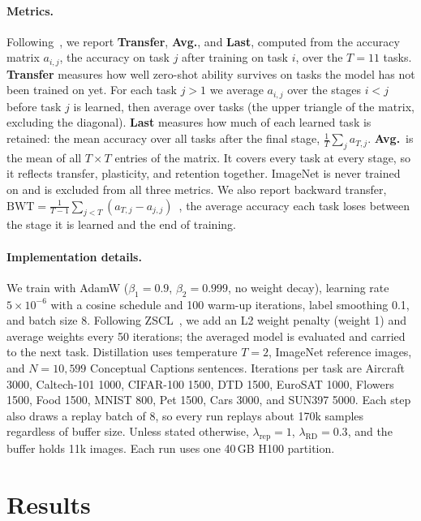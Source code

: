 \documentclass[10pt,twocolumn,letterpaper]{article}
\begin{document}
\paragraph{Metrics.}
Following~\cite{zheng2023zscl}, we report \textbf{Transfer}, \textbf{Avg.}, and
\textbf{Last}, computed from the accuracy matrix $a_{i,j}$, the accuracy on
task $j$ after training on task $i$, over the $T{=}11$ tasks.
\textbf{Transfer} measures how well zero-shot ability survives on tasks the
model has not been trained on yet. For each task $j>1$ we average
$a_{i,j}$ over the stages $i<j$ before task $j$ is learned, then average over
tasks (the upper triangle of the matrix, excluding the diagonal).
\textbf{Last} measures how much of each learned task is retained: the mean
accuracy over all tasks after the final stage, $\frac{1}{T}\sum_j a_{T,j}$.
\textbf{Avg.}\ is the mean of all $T\times T$ entries of the matrix. It covers
every task at every stage, so it reflects transfer, plasticity, and retention
together. ImageNet is never trained on and is excluded from all three
metrics. We also report backward transfer,
$\text{BWT}=\frac{1}{T-1}\sum_{j<T}(a_{T,j}-a_{j,j})$~\cite{lopezpaz2017gem},
the average accuracy each task loses between the stage it is learned and the
end of training.

\paragraph{Implementation details.}
We train with AdamW ($\beta_1{=}0.9$, $\beta_2{=}0.999$, no weight decay),
learning rate $5{\times}10^{-6}$ with a cosine schedule and 100 warm-up
iterations, label smoothing 0.1, and batch size 8. Following
ZSCL~\cite{zheng2023zscl}, we add an L2 weight penalty (weight 1) and average
weights every 50 iterations; the averaged model is evaluated and carried to the
next task. Distillation uses temperature $T{=}2$, ImageNet reference images, and
$N{=}10{,}599$ Conceptual Captions sentences. Iterations per task are Aircraft
3000, Caltech-101 1000, CIFAR-100 1500, DTD 1500, EuroSAT 1000, Flowers 1500,
Food 1500, MNIST 800, Pet 1500, Cars 3000, and SUN397 5000. Each step also
draws a replay batch of 8, so every run replays about 170k samples regardless
of buffer size. Unless stated otherwise, $\lambda_{\text{rep}}{=}1$,
$\lambda_{\text{RD}}{=}0.3$, and the buffer holds 11k images. Each run uses one
40\,GB H100 partition.

\section{Results}
\label{sec:results}
\end{document}
